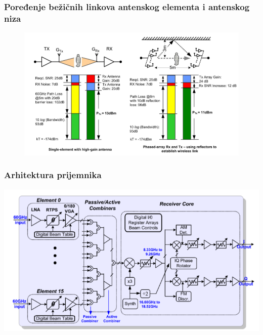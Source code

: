 \documentclass{beamer}
\begin{document}
\begin{frame}
\frametitle{Poređenje bežičnih linkova antenskog elementa i antenskog niza}
  \begin{figure}[!htbp]
    \centering
    \includegraphics[width=\linewidth]{link_single_element_vs_phased-array@60GHz.png}
    \label{fig:element_vs_array}
  \end{figure}
\end{frame}



\begin{frame}
  \frametitle{Arhitektura prijemnika}
  \includegraphics[width=\linewidth]{rx-arch-freq-plan.png}
\end{frame}
\end{document}

